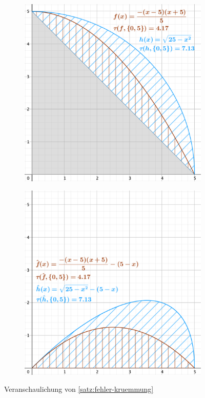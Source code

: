 \documentclass[12pt,a4paper]{scrartcl}
\numberwithin{equation}{section}
\numberwithin{myalgctr}{section}
\numberwithin{mytheoremctr}{subsection}
\numberwithin{mykorollarctr}{subsection}
\numberwithin{mylemmactr}{subsection}
\numberwithin{mybeispielctr}{subsection}
\begin{document}
	
	\begin{figure}[H]
		\centering
		\begin{subfigure}[c]{0.45\textwidth}
			\includegraphics[width=\linewidth]{../plots/fehler-kruemmung.png}
			 \label{fig:fehler-kruemmung-normal}
		\end{subfigure}
	\hfill
		\begin{subfigure}[c]{0.45\textwidth}
			\includegraphics[width=\linewidth]{../plots/fehler-kruemmung-satz.png}
			 \label{fig:fehler-kruemmung-satz}
		\end{subfigure}
		\caption{Veranschaulichung von \cref{satz:fehler-kruemmung}}
		\label{fig:fehler-kruemmung}
	\end{figure}
	
\end{document}

